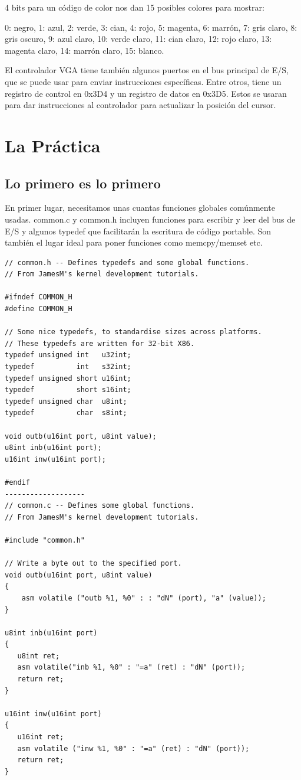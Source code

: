 \documentclass{report}
\begin{document}
4 bits para un c\'odigo de color nos dan 15 posibles colores para mostrar:

0: negro, 1: azul, 2: verde, 3: cian, 4: rojo, 5: magenta, 6: marr\'on, 7: gris claro, 8: gris oscuro, 9: azul claro, 10: verde claro, 11: cian claro, 12: rojo claro, 13: magenta claro, 14: marr\'on claro, 15: blanco.

 
El controlador VGA tiene tambi\'en algunos puertos en el bus principal de E/S, que se puede usar para enviar instrucciones espec\'ificas. Entre otros, tiene un registro de control en 0x3D4 y un registro de datos en 0x3D5. Estos se usaran para dar instrucciones al controlador para actualizar la posici\'on del cursor.

\section{La Pr\'actica}
\subsection{Lo primero es lo primero}
En primer lugar, necesitamos unas cuantas funciones globales com\'unmente usadas. common.c y common.h incluyen funciones para escribir y leer del bus de E/S y algunos typedef que facilitar\'an la escritura de c\'odigo portable. Son tambi\'en el lugar ideal para poner funciones como memcpy/memset etc. 

\begin{lstlisting}
// common.h -- Defines typedefs and some global functions.
// From JamesM's kernel development tutorials.

#ifndef COMMON_H
#define COMMON_H

// Some nice typedefs, to standardise sizes across platforms.
// These typedefs are written for 32-bit X86.
typedef unsigned int   u32int;
typedef          int   s32int;
typedef unsigned short u16int;
typedef          short s16int;
typedef unsigned char  u8int;
typedef          char  s8int;

void outb(u16int port, u8int value);
u8int inb(u16int port);
u16int inw(u16int port);

#endif
-------------------
// common.c -- Defines some global functions.
// From JamesM's kernel development tutorials.

#include "common.h"

// Write a byte out to the specified port.
void outb(u16int port, u8int value)
{
    asm volatile ("outb %1, %0" : : "dN" (port), "a" (value));
}

u8int inb(u16int port)
{
   u8int ret;
   asm volatile("inb %1, %0" : "=a" (ret) : "dN" (port));
   return ret;
}

u16int inw(u16int port)
{
   u16int ret;
   asm volatile ("inw %1, %0" : "=a" (ret) : "dN" (port));
   return ret;
}

\end{lstlisting}
\end{document}
